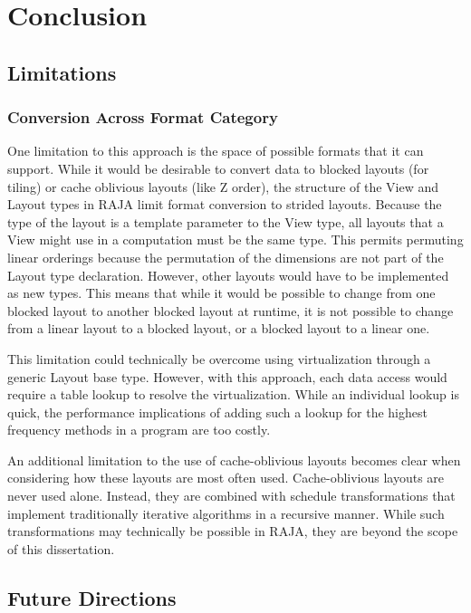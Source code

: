 \chapter{Conclusion}\label{chap:Conclusion}

\section{Limitations}

\subsection{Conversion Across Format Category}
One limitation to this approach is the space of possible formats that it can support. 
While it would be desirable to convert data to blocked layouts (for tiling) or cache oblivious layouts (like Z order), the structure of the View and Layout types in RAJA limit format conversion to strided layouts. 
Because the type of the layout is a template parameter to the View type, all layouts that a View might use in a computation must be the same type. 
This permits permuting linear orderings because the permutation of the dimensions are not part of the Layout type declaration. 
However, other layouts would have to be implemented as new types. 
This means that while it would be possible to change from one blocked layout to another blocked layout at runtime, it is not possible to change from a linear layout to a blocked layout, or a blocked layout to a linear one.

This limitation could technically be overcome using virtualization through a generic Layout base type. 
However, with this approach, each data access would require a table lookup to resolve the virtualization. 
While an  individual lookup is quick, the performance implications of adding such a lookup for the highest frequency methods in a program are too costly.

An additional limitation to the use of cache-oblivious layouts becomes clear when considering how these layouts are most often used. 
Cache-oblivious layouts are never used alone. 
Instead, they are combined with schedule transformations that implement traditionally iterative algorithms in a recursive manner. 
While such transformations may technically be possible in RAJA, they are beyond the scope of this dissertation.

\section{Future Directions}

